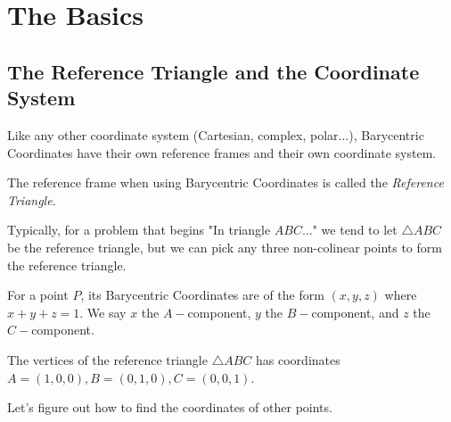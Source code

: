 \documentclass[11pt]{scrartcl}
\begin{document}

\tableofcontents

\newpage

\section{The Basics}
\subsection{The Reference Triangle and the Coordinate System}

Like any other coordinate system (Cartesian, complex, polar...), Barycentric Coordinates have their own reference frames and their own coordinate system. \newline

\begin{definition}
  The reference frame when using Barycentric Coordinates is called the \emph{Reference Triangle}.
\end{definition}

Typically, for a problem that begins "In triangle $ABC$..." we tend to let $\triangle ABC$ be the reference triangle, but we can pick any three non-colinear points to form the reference triangle. 

\begin{definition}
  For a point $P$, its Barycentric Coordinates are of the form $(x,y,z)$ where $x+y+z=1$. We say $x$ the $A-$component, $y$ the $B-$component, and $z$ the $C-$component.
\end{definition}

\begin{fact}
    The vertices of the reference triangle $\triangle ABC$ has coordinates $A=(1,0,0),B=(0,1,0),C=(0,0,1)$.
\end{fact}

Let's figure out how to find the coordinates of other points.   


\end{document}
